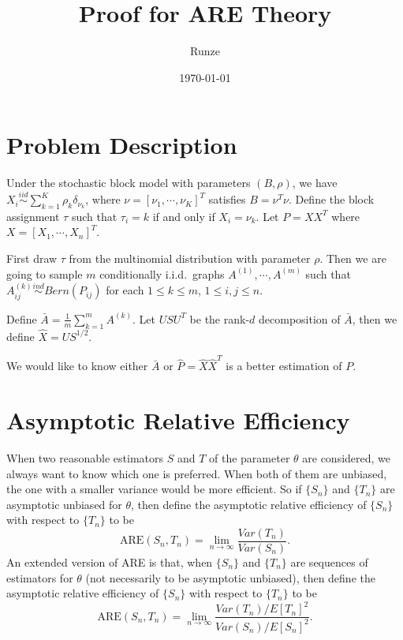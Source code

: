 \documentclass[a4paper]{article}
\title{Proof for ARE Theory}
\author{Runze}
\date{\today}
\begin{document}
\maketitle

\section{Problem Description}

Under the stochastic block model with parameters $(B, \rho)$, we have $X_i \stackrel{iid}{\sim} \sum_{k=1}^K \rho_k \delta_{\nu_k}$, where $\nu = [\nu_1, \cdots, \nu_K]^T$ satisfies $B = \nu^T \nu$. Define the block assignment $\tau$ such that $\tau_i = k$ if and only if $X_i = \nu_k$. Let $P = X X^T$ where $X = [X_1, \cdots, X_n]^T$.

First draw $\tau$ from the multinomial distribution with parameter $\rho$. Then we are going to sample $m$ conditionally i.i.d.~graphs $A^{(1)}, \cdots, A^{(m)}$ such that $A^{(k)}_{ij} \stackrel{ind}{\sim} Bern(P_{ij})$ for each $1 \le k \le m$, $1 \le i, j \le n$.

Define $\bar{A} = \frac{1}{m} \sum_{k=1}^m A^{(k)}$. Let $U S U^T$ be the rank-$d$ decomposition of $\bar{A}$, then we define $\hat{X} = U S^{1/2}$.

We would like to know either $\bar{A}$ or $\hat{P} = \hat{X} \hat{X}^T$ is a better estimation of $P$.




\section{Asymptotic Relative Efficiency}

When two reasonable estimators $S$ and $T$ of the parameter $\theta$ are considered, we always want to know which one is preferred. When both of them are unbiased, the one with a smaller variance would be more efficient. So if $\{S_n\}$ and $\{T_n\}$ are asymptotic unbiased for $\theta$, then define the asymptotic relative efficiency of $\{S_n\}$ with respect to $\{T_n\}$ to be
\[
	\mathrm{ARE}(S_n, T_n) = \lim_{n \rightarrow \infty} \frac{Var(T_n)}{Var(S_n)}.
\]
An extended version of ARE is that, when $\{S_n\}$ and $\{T_n\}$ are sequences of estimators for $\theta$ (not necessarily to be asymptotic unbiased), then define the asymptotic relative efficiency of $\{S_n\}$ with respect to $\{T_n\}$ to be
\[
	\mathrm{ARE}(S_n, T_n) = \lim_{n \rightarrow \infty} \frac{Var(T_n)/E[T_n]^2}{Var(S_n)/E[S_n]^2}.
\]
\end{document}
